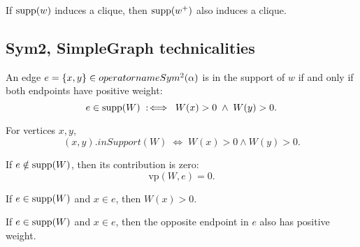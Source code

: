 \begin{lemma}\label{lem:enhance-clique}
\leanok
{}
If $\operatorname{supp}(w)$ induces a clique, then $\operatorname{supp}(w^+)$ also induces a clique.
\end{lemma}

\subsection{Sym2, SimpleGraph technicalities}

\begin{definition}\label{def:sym2-insupport}
\leanok
\uses{}
An edge $e=\{x,y\}\in\\operatorname{Sym^2}(\alpha)$ is in the support of $w$ if and only if both endpoints have positive weight:
\[
  e\in\operatorname{supp}(W) \;:\!\iff\; W(x)>0 \;\wedge\; W(y)>0.
\]
\end{definition}

\begin{lemma}\label{lem:sym2-insupport-explicit}
\leanok
{}
For vertices $x,y$,
\[
  (x,y).inSupport(W) \;\iff\; W(x)>0 \wedge W(y)>0.
\]
\end{lemma}

\begin{lemma}\label{lem:sym2-notinsupport}
\leanok
{}
If $e\notin\operatorname{supp}(W)$, then its contribution is zero:
\[
  \mathrm{vp}(W,e)=0.
\]
\end{lemma}

\begin{lemma}\label{lem:sym2-insupport-mem}
\leanok
{}
If $e\in\operatorname{supp}(W)$ and $x\in e$, then $W(x)>0$.
\end{lemma}

\begin{lemma}\label{lem:sym2-insupport-other}
\leanok
{}
If $e\in\operatorname{supp}(W)$ and $x\in e$, then the opposite endpoint in $e$ also has positive weight.
\end{lemma}

